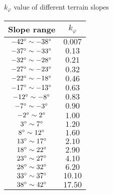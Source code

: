 \begin{center}
    \begin{threeparttable}
        \caption{$k_{\varphi}$ value of different terrain slopes}
        \begin{tabular}{cc}
            \hline
            Slope range & $k_{\varphi}$\\
            \hline
            $-42\degree \sim -38\degree$ & $0.007$\\
            $-37\degree \sim -33\degree$ & $0.13$\\
            $-32\degree \sim -28\degree$ & $0.21$\\
            $-27\degree \sim -23\degree$ & $0.32$\\
            $-22\degree \sim -18\degree$ & $0.46$\\
            $-17\degree \sim -13\degree$ & $0.63$\\
            $-12\degree \sim -8\degree$ & $0.83$\\
            $-7\degree \sim -3\degree$ & $0.90$\\
            $-2\degree \sim 2\degree$ & $1.00$\\
            $3\degree \sim 7\degree$ & $1.20$\\
            $8\degree \sim 12\degree$ & $1.60$\\
            $13\degree \sim 17\degree$ & $2.10$\\
            $18\degree \sim 22\degree$ & $2.90$\\
            $23\degree \sim 27\degree$ & $4.10$\\
            $28\degree \sim 32\degree$ & $6.20$\\
            $33\degree \sim 37\degree$ & $10.10$\\
            $38\degree \sim 42\degree$ & $17.50$\\
            \hline
        \end{tabular}
        \label{tab:kphi}
    \end{threeparttable}

\end{center}


